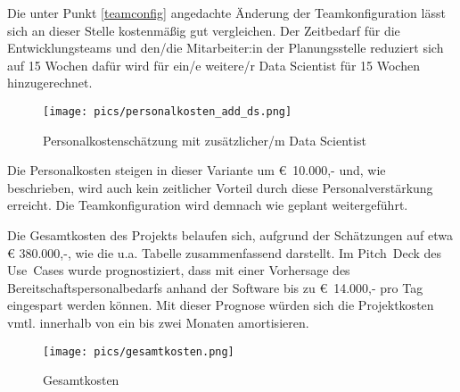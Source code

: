 Die unter Punkt \ref{teamconfig} angedachte Änderung der Teamkonfiguration lässt sich an dieser Stelle kostenmäßig gut vergleichen. Der Zeitbedarf für die Entwicklungsteams und den/die Mitarbeiter:in der Planungsstelle reduziert sich auf 15 Wochen dafür wird für ein/e weitere/r Data Scientist für 15 Wochen hinzugerechnet. 

\begin{figure}[h]
\centering
\texttt{[image: pics/personalkosten\_add\_ds.png]}
\caption{Personalkostenschätzung mit zusätzlicher/m Data Scientist} 
\label{fig:costs_add_ds}
\end{figure}

\FloatBarrier

Die Personalkosten steigen in dieser Variante um €~10.000,- und, wie beschrieben, wird auch kein zeitlicher Vorteil durch diese Personalverstärkung erreicht. Die Teamkonfiguration wird demnach wie geplant weitergeführt.

Die Gesamtkosten des Projekts belaufen sich, aufgrund der Schätzungen auf etwa € 380.000,-, wie die u.a. Tabelle zusammenfassend darstellt. Im Pitch~Deck des Use~Cases wurde prognostiziert, dass mit einer Vorhersage des Bereitschaftspersonalbedarfs anhand der Software bis zu €~14.000,- pro Tag eingespart werden können. Mit dieser Prognose würden sich die Projektkosten vmtl. innerhalb von ein bis zwei Monaten amortisieren.

\begin{figure}[h]
\centering
\texttt{[image: pics/gesamtkosten.png]}
\caption{Gesamtkosten} 
\label{fig:total_costs}
\end{figure}

\FloatBarrier
